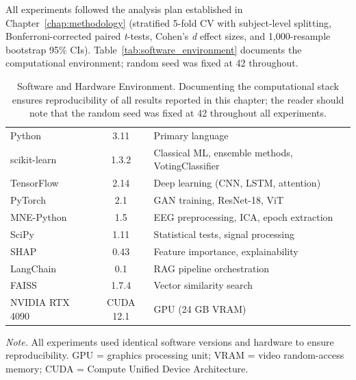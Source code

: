All experiments followed the analysis plan established in Chapter~\ref{chap:methodology} (stratified 5-fold CV with subject-level splitting, Bonferroni-corrected paired \textit{t}-tests, Cohen's \textit{d} effect sizes, and 1,000-resample bootstrap 95\% CIs). Table~\ref{tab:software_environment} documents the computational environment; random seed was fixed at 42 throughout.

\begin{table}[!htbp]
\tablestripes\tablefontsize
\caption[Software and Hardware Environment]{Software and Hardware Environment. Documenting the computational stack ensures reproducibility of all results reported in this chapter; the reader should note that the random seed was fixed at 42 throughout all experiments.}
\tablefontsize
\begin{tabularx}{\textwidth}{@{} >{\raggedright\arraybackslash}p{3cm} C L @{}}
\toprule
{} &  &  \\
\midrule
Python & 3.11 & Primary language \\
scikit-learn & 1.3.2 & Classical ML, ensemble methods, VotingClassifier \\
TensorFlow & 2.14 & Deep learning (CNN, LSTM, attention) \\
PyTorch & 2.1 & GAN training, ResNet-18, ViT \\
MNE-Python & 1.5 & EEG preprocessing, ICA, epoch extraction \\
SciPy & 1.11 & Statistical tests, signal processing \\
SHAP & 0.43 & Feature importance, explainability \\
LangChain & 0.1 & RAG pipeline orchestration \\
FAISS & 1.7.4 & Vector similarity search \\
\addlinespace
NVIDIA RTX 4090 & CUDA 12.1 & GPU (24 GB VRAM) \\
\bottomrule
\end{tabularx}
\vspace{0.5em}\noindent\textit{Note.} All experiments used identical software versions and hardware to ensure reproducibility. GPU = graphics processing unit; VRAM = video random-access memory; CUDA = Compute Unified Device Architecture.
\end{table}

